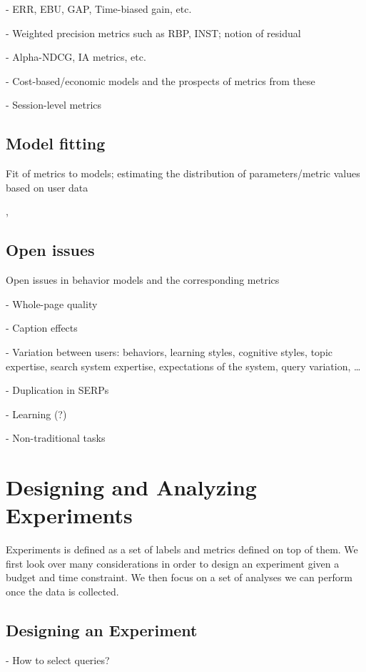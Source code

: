 \documentclass[openany]{now} %
\begin{document}
- ERR, EBU, GAP, Time-biased gain, etc.

- Weighted precision metrics such as RBP, INST; notion of residual

- Alpha-NDCG, IA metrics, etc.

- Cost-based/economic models and the prospects of metrics from these

- Session-level metrics \cite{kanoulas2011evaluating} \cite{Järvelin2008}

\section{Model fitting}

Fit of metrics to models; estimating the distribution of parameters/metric values based on user data

\cite{CarteretteKY11}, \cite{Moffat2013}

\section{Open issues}

Open issues in behavior models and the corresponding metrics

- Whole-page quality

- Caption effects

- Variation between users: behaviors, learning styles, cognitive styles, topic expertise, search system expertise, expectations of the system, query variation, \dots

- Duplication in SERPs

- Learning (?)

- Non-traditional tasks


\chapter{Designing and Analyzing Experiments}
\label{c-experiment-design}

Experiments is defined as a set of labels and metrics defined on top of them. We first look over many considerations in order to design an experiment given a budget and time constraint. We then focus on a set of analyses we can perform once the data is collected.

\section{Designing an Experiment}

- How to select queries?
\end{document}
